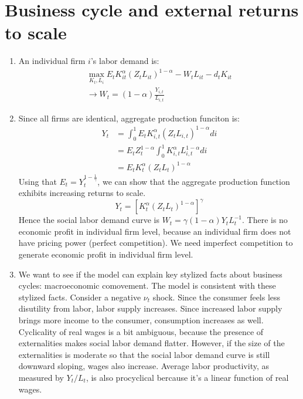 \documentclass[11pt]{amsart}
\begin{document}
\section{Business cycle and external returns to scale}
\begin{enumerate}[label=(\alph*)]
	\item An individual firm $i$'s labor demand is: 
	\begin{equation*}
	\left.\begin{array} { c } { \max _ { K _ { t } ,L _ { i } } E _ { t } K _ { i t } ^ { \alpha } \left( Z _ { t } L _ { i t } \right) ^ { 1- \alpha } - W _ { t } L _ { i t } - d _ { t } K _ { i t } } \\  \rightarrow { W _ { t } = ( 1- \alpha ) \frac{Y_{i,t}}{L_{i,t}} } \end{array} \right.
	\end{equation*}
	\item Since all firms are identical, aggregate production funciton is:
	\begin{align*}
	Y_t &= \int_{0}^{1} E_t K_{i,t}^\alpha \left( Z_t L_{i,t} \right)^{1-\alpha} di \\
	& = E_t Z_t^{1-\alpha} \int_{0}^{1} K_{i,t}^\alpha  L_{i,t}^{1-\alpha} di \\
	& = E_t K_t^\alpha (Z_t L_t)^{1-\alpha}
	\end{align*}
	Using that $E_t = Y_t^{1- \frac{1}{\gamma}}$, we can show that the aggregate production function exhibits increasing returns to scale. 
	\begin{equation*}
	Y _ { t } = \left[ K _ { t } ^ { \alpha } \left( Z _ { t } L _ { t } \right) ^ { 1- \alpha } \right] ^ { \gamma }
	\end{equation*}
	Hence the social labor demand curve is $W _ { t } = \gamma ( 1- \alpha ) Y _ { t } L _ { t } ^ { - 1}$. There is no economic profit in individual firm level, because an individual firm does not have pricing power (perfect competition). We need imperfect competition to generate economic profit in individual firm level. 
	\item We want to see if the model can explain key stylized facts about business cycles: macroeconomic comovement. The model is consistent with these stylized facts. Consider a negative $\nu_t$ shock. Since the consumer feels less disutility from labor, labor supply increases. Since increased labor supply brings more income to the consumer, consumption increases as well. Cyclicality of real wages is a bit ambiguous, because the presence of externalities makes social labor demand flatter. However, if the size of the externalities is moderate so that the social labor demand curve is still downward sloping, wages also increase. Average labor productivity, as measured by $Y_t/L_t$, is also procyclical bercause it's a linear function of real wages. 
	

\end{enumerate}
\end{document}
